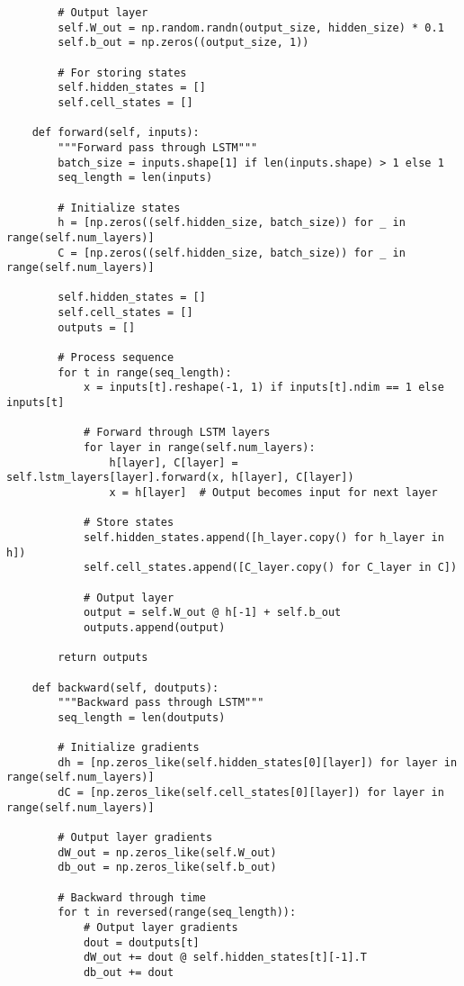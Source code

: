 ﻿\documentclass[12pt,a4paper]{article}
\begin{document}
\begin{lstlisting}
        # Output layer
        self.W_out = np.random.randn(output_size, hidden_size) * 0.1
        self.b_out = np.zeros((output_size, 1))
        
        # For storing states
        self.hidden_states = []
        self.cell_states = []
    
    def forward(self, inputs):
        """Forward pass through LSTM"""
        batch_size = inputs.shape[1] if len(inputs.shape) > 1 else 1
        seq_length = len(inputs)
        
        # Initialize states
        h = [np.zeros((self.hidden_size, batch_size)) for _ in range(self.num_layers)]
        C = [np.zeros((self.hidden_size, batch_size)) for _ in range(self.num_layers)]
        
        self.hidden_states = []
        self.cell_states = []
        outputs = []
        
        # Process sequence
        for t in range(seq_length):
            x = inputs[t].reshape(-1, 1) if inputs[t].ndim == 1 else inputs[t]
            
            # Forward through LSTM layers
            for layer in range(self.num_layers):
                h[layer], C[layer] = self.lstm_layers[layer].forward(x, h[layer], C[layer])
                x = h[layer]  # Output becomes input for next layer
            
            # Store states
            self.hidden_states.append([h_layer.copy() for h_layer in h])
            self.cell_states.append([C_layer.copy() for C_layer in C])
            
            # Output layer
            output = self.W_out @ h[-1] + self.b_out
            outputs.append(output)
        
        return outputs
    
    def backward(self, doutputs):
        """Backward pass through LSTM"""
        seq_length = len(doutputs)
        
        # Initialize gradients
        dh = [np.zeros_like(self.hidden_states[0][layer]) for layer in range(self.num_layers)]
        dC = [np.zeros_like(self.cell_states[0][layer]) for layer in range(self.num_layers)]
        
        # Output layer gradients
        dW_out = np.zeros_like(self.W_out)
        db_out = np.zeros_like(self.b_out)
        
        # Backward through time
        for t in reversed(range(seq_length)):
            # Output layer gradients
            dout = doutputs[t]
            dW_out += dout @ self.hidden_states[t][-1].T
            db_out += dout
            

\end{lstlisting}
\end{document}

